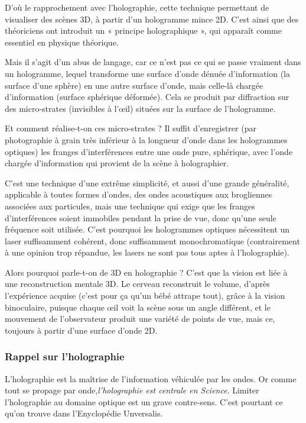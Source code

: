 \documentclass[a4paper,12pt]{article}
\begin{document}
D'où le rapprochement avec l'holographie, cette technique permettant de visualiser des scènes 3D, à partir d'un hologramme mince 2D. C'est ainsi que des théoriciens ont introduit un « principe holographique », qui apparaît comme essentiel en physique théorique.



Mais il s'agit d'un abus de langage, car ce n'est pas ce qui se passe vraiment dans un hologramme, lequel transforme une surface d'onde dénuée d'information (la surface d'une sphère) en une autre surface d'onde, mais celle-là chargée d'information (surface sphérique déformée). Cela se produit par diffraction sur des micro-strates (invisibles à l’œil) situées sur la surface de l'hologramme. 


Et comment réalise-t-on ces micro-strates ? Il suffit d'enregistrer (par photographie à grain très inférieur à la longueur d'onde dans les hologrammes optiques) les franges d'interférences entre une onde pure, sphérique, avec l'onde chargée d'information qui provient de la scène à holographier. 


C'est une technique d'une extrême simplicité, et aussi d'une grande généralité, applicable à toutes formes d'ondes, des ondes acoustiques aux brogliennes associées aux particules, mais une  technique qui exige que les franges d'interférences soient immobiles pendant la prise de vue, donc qu'une seule fréquence soit utilisée. C'est pourquoi les hologrammes optiques nécessitent un laser suffisamment cohérent, donc suffisamment monochromatique (contrairement à une opinion trop répandue, les lasers ne sont pas tous aptes à l'holographie).



Alors pourquoi parle-t-on de 3D en holographie ? C'est que la vision est liée à une reconstruction mentale 3D. Le cerveau reconstruit le volume, d'après l'expérience acquise (c'est pour ça qu'un bébé attrape tout), grâce à la vision binoculaire, puisque chaque œil voit la scène sous un angle différent, et le mouvement de l'observateur produit une variété de points de vue, mais ce, toujours à partir d'une surface d'onde 2D.



\subsubsection{Rappel sur l'holographie}

L'holographie est la ma\^itrise de l'information véhiculée par les ondes. Or comme tout se propage par onde,\textit {l'holographie est centrale en Science}. Limiter l'holographie au domaine optique est un grave contre-sens. C'est pourtant ce qu'on trouve dans l'Enyclopédie Unversalis. 
\end{document}
